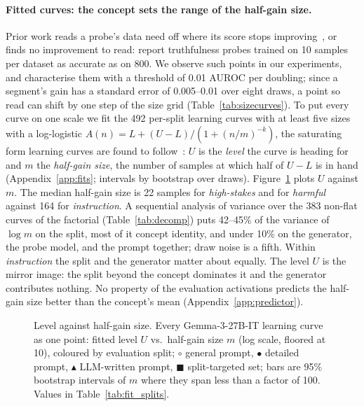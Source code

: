 \documentclass{article} %
\newcommand{\hs}{\emph{high-stakes}}
\newcommand{\harm}{\emph{harmful}}
\newcommand{\instr}{\emph{instruction}}
\begin{document}
\paragraph{Fitted curves: the concept sets the range of the half-gain size.}
Prior work reads a probe's data need off where its score stops improving~\citep{mckenzie2025highstakes}, or finds no improvement to read: \citet{liu2024truthfulness} report truthfulness probes trained on 10 samples per dataset as accurate as on 800. We observe such points in our experiments, and characterise them with a threshold of 0.01 AUROC per doubling; since a segment's gain has a standard error of 0.005--0.01 over eight draws, a point so read can shift by one step of the size grid (Table~\ref{tab:sizecurves}). To put every curve on one scale we fit the 492 per-split learning curves with at least five sizes with a log-logistic $A(n)=L+(U-L)/(1+(n/m)^{-k})$, the saturating form learning curves are found to follow~\citep{hestness2017deep,viering2023shape}: $U$ is the \emph{level} the curve is heading for and $m$ the \emph{half-gain size}, the number of samples at which half of $U-L$ is in hand (Appendix~\ref{app:fits}; intervals by bootstrap over draws). Figure~\ref{fig:fits} plots $U$ against $m$. The median half-gain size is 22 samples for \hs{} and for \harm{} against 164 for \instr{}. A sequential analysis of variance over the 383 non-flat curves of the factorial (Table~\ref{tab:decomp}) puts 42--45\% of the variance of $\log m$ on the split, most of it concept identity, and under 10\% on the generator, the probe model, and the prompt together; draw noise is a fifth. Within \instr{} the split and the generator matter about equally. The level $U$ is the mirror image: the split beyond the concept dominates it and the generator contributes nothing. No property of the evaluation activations predicts the half-gain size better than the concept's mean (Appendix~\ref{app:predictor}).

\begin{figure}[t]
  \centering
  
  \caption{Level against half-gain size. Every Gemma-3-27B-IT learning curve as one point: fitted level $U$ vs.\ half-gain size $m$ (log scale, floored at 10), coloured by evaluation split; $\circ$ general prompt, $\bullet$ detailed prompt, $\blacktriangle$ LLM-written prompt, $\blacksquare$ split-targeted set; bars are 95\% bootstrap intervals of $m$ where they span less than a factor of 100. Values in Table~\ref{tab:fit_splits}.}
  \label{fig:fits}
\end{figure}
\end{document}
